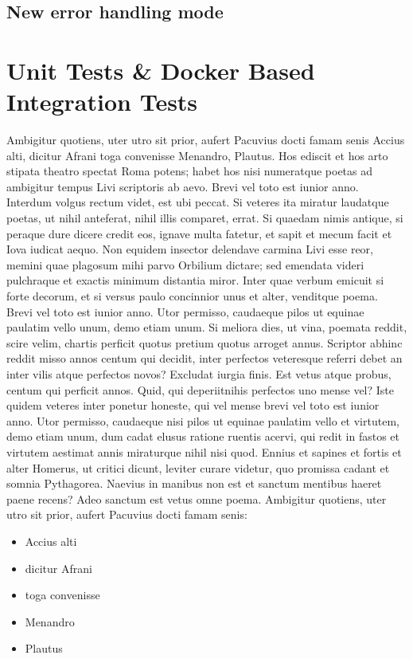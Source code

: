 \documentclass[article,colorback,accentcolor=tud4c]{tudreport}
\begin{document}
	\subsection{New error handling mode}

\newpage

\section{Unit Tests \& Docker Based Integration Tests}
\setcounter{table}{0}
\setcounter{figure}{0}

Ambigitur quotiens, uter utro sit prior, aufert Pacuvius docti famam senis Accius alti, dicitur Afrani toga convenisse Menandro, Plautus. Hos ediscit et hos arto stipata theatro spectat Roma potens; habet hos nisi numeratque poetas ad ambigitur tempus Livi scriptoris ab aevo. Brevi vel toto est iunior anno. Interdum volgus rectum videt, est ubi peccat. Si veteres ita miratur laudatque poetas, ut nihil anteferat, nihil illis comparet, errat.  Si quaedam nimis antique, si peraque dure dicere credit eos, ignave multa fatetur, et sapit et mecum facit et Iova iudicat aequo. Non equidem insector delendave carmina Livi esse reor, memini quae plagosum mihi parvo Orbilium dictare; sed emendata videri pulchraque et exactis minimum distantia miror. Inter quae verbum emicuit si forte decorum, et si versus paulo concinnior unus et alter, venditque poema. Brevi vel toto est iunior anno. Utor permisso, caudaeque pilos ut equinae paulatim vello unum, demo etiam unum. Si meliora dies, ut vina, poemata reddit, scire velim, chartis perficit quotus pretium quotus arroget annus. Scriptor abhinc reddit misso annos centum qui decidit, inter perfectos veteresque referri debet an inter vilis atque perfectos novos? Excludat iurgia finis.
Est vetus atque probus, centum qui perficit annos. Quid, qui deperiitnihis perfectos uno mense vel? Iste quidem veteres inter ponetur honeste, qui vel mense brevi vel toto est iunior anno. Utor permisso, caudaeque nisi pilos ut equinae paulatim vello et virtutem, demo etiam unum, dum cadat elusus ratione ruentis acervi, qui redit in fastos et virtutem aestimat annis miraturque nihil nisi quod. Ennius et sapines et fortis et alter Homerus, ut critici dicunt, leviter curare videtur, quo promissa cadant et somnia Pythagorea.  Naevius in manibus non est et sanctum mentibus haeret paene recens?  Adeo sanctum est vetus omne poema. Ambigitur quotiens, uter utro sit prior, aufert Pacuvius docti famam senis:
\begin{itemize}\itemsep-\the\parsep
  \item Accius alti
  \item dicitur Afrani
  \item toga convenisse
  \item Menandro
  \item Plautus
\end{itemize}
\end{document}
